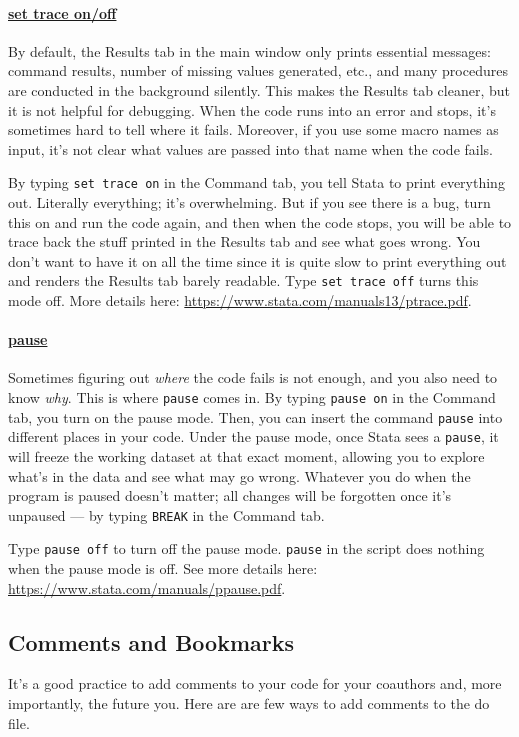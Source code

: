 \paragraph{\underline{set trace on/off}} By default, the Results tab in the main window only prints essential messages: command results, number of missing values generated, etc., and many procedures are conducted in the background silently. This makes the Results tab cleaner, but it is not helpful for debugging. When the code runs into an error and stops, it's sometimes hard to tell where it fails. Moreover, if you use some macro names as input, it's not clear what values are passed into that name when the code fails. 

By typing \verb|set trace on| in the Command tab, you tell Stata to print everything out. Literally everything; it's overwhelming. But if you see there is a bug, turn this on and run the code again, and then when the code stops, you will be able to trace back the stuff printed in the Results tab and see what goes wrong. You don't want to have it on all the time since it is quite slow to print everything out and renders the Results tab barely readable. Type \verb|set trace off| turns this mode off. More details here: \url{https://www.stata.com/manuals13/ptrace.pdf}.

\paragraph{\underline{pause}} Sometimes figuring out \textit{where} the code fails is not enough, and you also need to know \textit{why}. This is where \verb|pause| comes in. By typing \verb|pause on| in the Command tab, you turn on the pause mode. Then, you can insert the command \verb|pause| into different places in your code. Under the pause mode, once Stata sees a \verb|pause|, it will freeze the working dataset at that exact moment, allowing you to explore what's in the data and see what may go wrong. Whatever you do when the program is paused doesn't matter; all changes will be forgotten once it's unpaused --- by typing \verb|BREAK| in the Command tab.

Type \verb|pause off| to turn off the pause mode. \verb|pause| in the script does nothing when the pause mode is off. See more details here: \url{https://www.stata.com/manuals/ppause.pdf}.

\subsection{Comments and Bookmarks}
It's a good practice to add comments to your code for your coauthors and, more importantly, the future you. Here are are few ways to add comments to the do file. 

